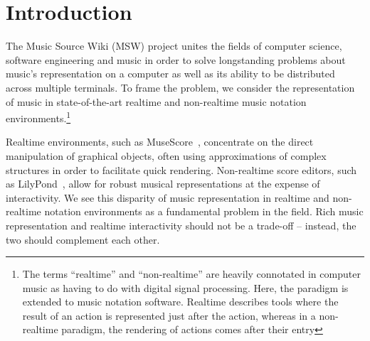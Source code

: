 \documentclass{article}
\title{\papertitle}
\begin{document}
%
\capstartfalse
\maketitle
\capstarttrue
%
\begin{abstract}
The Music Source Wiki project aims to create a wiki for the collective
editing, visualization and auralization of musical-source documents on
the web. It will do so by developing a robust music representation language
that describes several music phenomena (notation, audio, processes) through
a small axiomatic language. A web API will be created to transmit this
language between terminals, and a wiki-like website will allow for the
realtime editing and just-in-time compilation of musical source documents.
The present paper presents the basic objectives of the project as well as
three major phases into which the research and development will be divided.
The project is a joint endeavor between researchers
affiliated with the Grame (Lyon) and the Sibelius Academy (Finland).
\end{abstract}
%

\section{Introduction}\label{sec:introduction}
The Music Source Wiki (MSW) project unites the fields of computer science, software
engineering and music in order to solve longstanding problems about music’s
representation on a computer as well as its ability to be distributed across
multiple terminals. To frame the problem, we consider the representation of
music in state-of-the-art real\-time and non-real\-time music notation
environments.\footnote{The terms ``real\-time'' and ``non-real\-time'' are heavily
connotated in computer music as having to do with digital signal processing.
Here, the paradigm is extended to music notation software. Realtime
describes tools where the result of an action is
represented just after the action, whereas in a non-realtime paradigm, the
rendering of actions comes after their entry}

Realtime environments, such as MuseScore~\cite{musescore}, concentrate on
the direct manipulation of graphical objects, often using approximations of complex structures in
order to facilitate quick rendering. Non-real\-time score editors, such as
LilyPond~\cite{lilypond06}, allow for robust musical representations at the expense of
interactivity. We see this disparity of music representation in real\-time and
non-real\-time notation environments as a fundamental problem in the field. Rich music
representation and real\-time interactivity should not be a trade-off --
instead, the two should complement each other.
\end{document}
